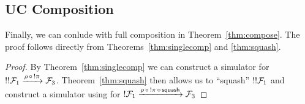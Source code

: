 \subsection{UC Composition}
Finally, we can conlude with full composition in Theorem~\ref{thm:compose}.
The proof follows directly from Theorems~\ref{thm:singlecomp} and \ref{thm:squash}.

\begin{proof}
By Theorem~\ref{thm:singlecomp} we can construct a simulator  for $!!\mathcal{F}_1 \xrightarrow{\rho \, \circ \, !\pi} \mathcal{F}_3$.
Theorem~\ref{thm:squash} then allows us to ``squash'' $!!\mathcal{F}_1$ and construct a simulator using  for $!\mathcal{F}_1 \xrightarrow{\rho \, \circ \, !\pi \, \circ \, {\mathsf {squash}}} \mathcal{F}_3$
\end{proof}
